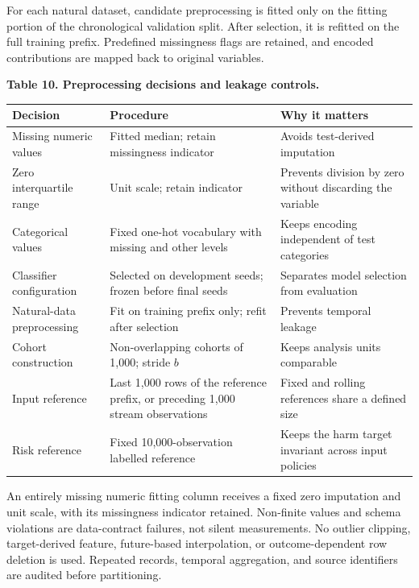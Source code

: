\documentclass[
]{article}
\begin{document}
For each natural dataset, candidate preprocessing is fitted only on the
fitting portion of the chronological validation split. After selection,
it is refitted on the full training prefix. Predefined missingness flags
are retained, and encoded contributions are mapped back to original
variables.

\textbf{Table 10. Preprocessing decisions and leakage controls.}

\begin{longtable}[]{@{}
  >{\raggedright\arraybackslash}p{}
  >{\raggedright\arraybackslash}p{}
  >{\raggedright\arraybackslash}p{}@{}}
\toprule
Decision & Procedure & Why it matters \\
\midrule
\endhead
Missing numeric values & Fitted median; retain missingness indicator &
Avoids test-derived imputation \\
Zero interquartile range & Unit scale; retain indicator & Prevents
division by zero without discarding the variable \\
Categorical values & Fixed one-hot vocabulary with missing and other
levels & Keeps encoding independent of test categories \\
Classifier configuration & Selected on development seeds; frozen before
final seeds & Separates model selection from evaluation \\
Natural-data preprocessing & Fit on training prefix only; refit after
selection & Prevents temporal leakage \\
Cohort construction & Non-overlapping cohorts of 1,000; stride \(b\) &
Keeps analysis units comparable \\
Input reference & Last 1,000 rows of the reference prefix, or preceding
1,000 stream observations & Fixed and rolling references share a defined
size \\
Risk reference & Fixed 10,000-observation labelled reference & Keeps the
harm target invariant across input policies \\
\bottomrule
\end{longtable}

An entirely missing numeric fitting column receives a fixed zero
imputation and unit scale, with its missingness indicator retained.
Non-finite values and schema violations are data-contract failures, not
silent measurements. No outlier clipping, target-derived feature,
future-based interpolation, or outcome-dependent row deletion is used.
Repeated records, temporal aggregation, and source identifiers are
audited before partitioning.
\end{document}
